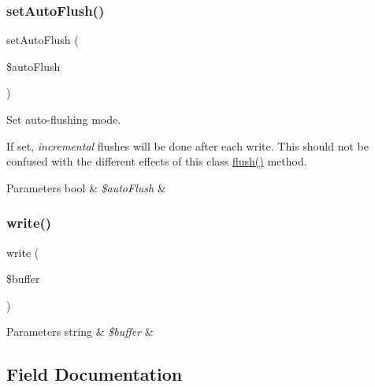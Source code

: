 \subsubsection{\texorpdfstring{set\+Auto\+Flush()}{setAutoFlush()}}
{\footnotesize\ttfamily set\+Auto\+Flush (\begin{DoxyParamCaption}\item[{}]{\$auto\+Flush }\end{DoxyParamCaption})}

Set auto-\/flushing mode.

If set, {\itshape incremental} flushes will be done after each write. This should not be confused with the different effects of this class\textquotesingle{} \mbox{\hyperlink{class_p_h_p_unit___util___printer_a7751f77b5263bcf940ece6e824a05b38}{flush()}} method.


\begin{DoxyParams}[1]{Parameters}
bool & {\em \$auto\+Flush} & \\
\hline
\end{DoxyParams}
\mbox{\label{class_p_h_p_unit___util___printer_ab3c1b3a323cbbf707c55cc3cd3efd811}} 
\subsubsection{\texorpdfstring{write()}{write()}}
{\footnotesize\ttfamily write (\begin{DoxyParamCaption}\item[{}]{\$buffer }\end{DoxyParamCaption})}


\begin{DoxyParams}[1]{Parameters}
string & {\em \$buffer} & \\
\hline
\end{DoxyParams}


\subsection{Field Documentation}
\mbox{\label{class_p_h_p_unit___util___printer_aef8c7c76f1d8d3bce4c43e7e6d736f3a}} 
